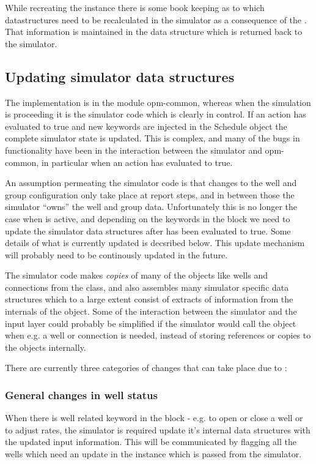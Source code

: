 While recreating the  instance there is some book keeping
as to which datastructures need to be recalculated in the simulator as a
consequence of the \actionx{}. That information is maintained in the data
structure  which is returned back to the
simulator.


\subsection{Updating simulator data structures}
The \actionx{} implementation is in the module opm-common, whereas when the
simulation is proceeding it is the simulator code which is clearly in control.
If an action has evaluated to true and new keywords are injected in the Schedule
object the complete simulator state is updated. This is complex, and many of the
bugs in \actionx{} functionality have been in the interaction between the
simulator and opm-common, in particular when an action has evaluated to true.

An assumption permeating the simulator code is that changes to the well and
group configuration only take place at report steps, and in between those the
simulator ``owns'' the well and group data. Unfortunately this is no longer the
case when \actionx{} is active, and depending on the keywords in the \actionx{}
block we need to update the simulator data structures after \actionx{} has been
evaluated to true. Some details of what is currently updated is decsribed below.
This update mechanism will probably need to be continously updated in the
future.

The simulator code makes \emph{copies} of many of the objects like wells and
connections from the  class, and also assembles many
simulator specific data structures which to a large extent consist of extracts
of information from the internals of the  object. Some of
the interaction between the simulator and the input layer could probably be
simplified if the simulator would call the  object when
e.g. a well or connection is needed, instead of storing references or copies to
the  objects internally.

There are currently three categories of changes that can take place due to
\actionx{}:


\subsubsection{General changes in well status}
\label{actionx_change_well}
When there is well related keyword in the \actionx{} block - e.g. 
to open or close a well or  to adjust rates, the simulator is
required update it's internal data structures with the updated input information.
This will be communicated by flagging all the wells which need an update in the
 instance which is passed from the
simulator.


